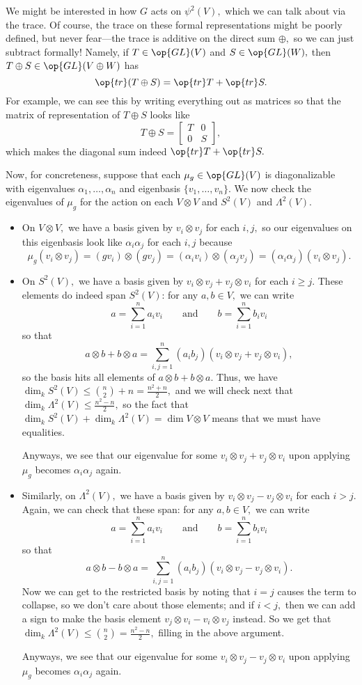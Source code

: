 \documentclass[../notes.tex]{subfiles}
\begin{document}
We might be interested in how $G$ acts on $\psi^2(V),$ which we can talk about via the trace. Of course, the trace on these formal representations might be poorly defined, but never fear---the trace is additive on the direct sum $\oplus,$ so we can just subtract formally! Namely, if $T\in\op{GL}(V)$ and $S\in\op{GL}(W),$ then $T\oplus S\in\op{GL}(V\oplus W)$ has
\[\op{tr}(T\oplus S)=\op{tr}T+\op{tr}S.\]
For example, we can see this by writing everything out as matrices so that the matrix of representation of $T\oplus S$ looks like
\[T\oplus S=\begin{bmatrix}
	T & 0 \\
	0 & S
\end{bmatrix},\]
which makes the diagonal sum indeed $\op{tr}T+\op{tr}S.$

Now, for concreteness, suppose that each $\mu_g\in\op{GL}(V)$ is diagonalizable with eigenvalues $\alpha_1,\ldots,\alpha_n$ and eigenbasis $\{v_1,\ldots,v_n\}.$ We now check the eigenvalues of $\mu_g$ for the action on each $V\otimes V$ and $S^2(V)$ and $\Lambda^2(V).$
\begin{itemize}
	\item On $V\otimes V,$ we have a basis given by $v_i\otimes v_j$ for each $i,j,$ so our eigenvalues on this eigenbasis look like $\alpha_i\alpha_j$ for each $i,j$ because
	\[\mu_g(v_i\otimes v_j)=(gv_i)\otimes(gv_j)=(\alpha_iv_i)\otimes(\alpha_jv_j)=(\alpha_i\alpha_j)(v_i\otimes v_j).\]
	\item On $S^2(V),$ we have a basis given by $v_i\otimes v_j+v_j\otimes v_i$ for each $i\ge j.$ These elements do indeed span $S^2(V)$: for any $a,b\in V,$ we can write
	\[a=\sum_{i=1}^na_iv_i\qquad\text{and}\qquad b=\sum_{i=1}^nb_iv_i\]
	so that
	\[a\otimes b+b\otimes a=\sum_{i,j=1}^n(a_ib_j)(v_i\otimes v_j+v_j\otimes v_i),\]
	so the basis hits all elements of $a\otimes b+b\otimes a.$ Thus, we have $\dim_kS^2(V)\le\binom n2+n=\frac{n^2+n}2,$ and we will check next that $\dim_k\Lambda^2(V)\le\frac{n^2-n}2,$ so the fact that $\dim_kS^2(V)+\dim_k\Lambda^2(V)=\dim V\otimes V$ means that we must have equalities.

	Anyways, we see that our eigenvalue for some $v_i\otimes v_j+v_j\otimes v_i$ upon applying $\mu_g$ becomes $\alpha_i\alpha_j$ again.
	\item Similarly, on $\Lambda^2(V),$ we have a basis given by $v_i\otimes v_j-v_j\otimes v_i$ for each $i>j.$ Again, we can check that these span: for any $a,b\in V,$ we can write
	\[a=\sum_{i=1}^na_iv_i\qquad\text{and}\qquad b=\sum_{i=1}^nb_iv_i\]
	so that
	\[a\otimes b-b\otimes a=\sum_{i,j=1}^n(a_ib_j)(v_i\otimes v_j-v_j\otimes v_i).\]
	Now we can get to the restricted basis by noting that $i=j$ causes the term to collapse, so we don't care about those elements; and if $i<j,$ then we can add a sign to make the basis element $v_j\otimes v_i-v_i\otimes v_j$ instead. So we get that $\dim_k\Lambda^2(V)\le\binom n2=\frac{n^2-n}2,$ filling in the above argument.

	Anyways, we see that our eigenvalue for some $v_i\otimes v_j-v_j\otimes v_i$ upon applying $\mu_g$ becomes $\alpha_i\alpha_j$ again.
\end{itemize}
\end{document}
